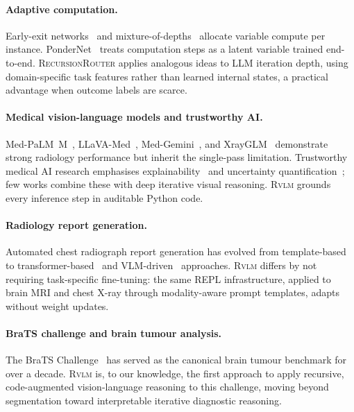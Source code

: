 \documentclass{article}
\newcommand{\RVLM}{\textsc{Rvlm}}
\newcommand{\RRouter}{\textsc{RecursionRouter}}
\begin{document}
	\paragraph{Adaptive computation.}
	Early-exit networks~\citep{teerapittayanon2016branchynet,schwartz2020right}
	and mixture-of-depths~\citep{raposo2024moe} allocate variable compute per
	instance.
	PonderNet~\citep{banino2021pondernet} treats computation steps as a latent
	variable trained end-to-end.
	\RRouter{} applies analogous ideas to LLM iteration depth, using
	domain-specific task features rather than learned internal states, 
	a practical advantage when outcome labels are scarce.
	
	\paragraph{Medical vision-language models and trustworthy AI.}
	Med-PaLM~M~\citep{tu2024medpalm}, LLaVA-Med~\citep{li2024llavamed},
	Med-Gemini~\citep{tu2025medgemini}, and XrayGLM~\citep{chen2024xrayglm}
	demonstrate strong radiology performance but inherit the single-pass
	limitation.
	Trustworthy medical AI research emphasises explainability~\citep{selvaraju2017gradcam}
	and uncertainty quantification~\citep{obermeyer2019dissecting}; few works
	combine these with deep iterative visual reasoning.
	\RVLM{} grounds every inference step in auditable Python code.
	
	\paragraph{Radiology report generation.}
	Automated chest radiograph report generation has evolved from
	template-based~\citep{jing2017automatic} to
	transformer-based~\citep{chen2020generating,miura2021improving} and
	VLM-driven~\citep{hyland2024maira,chen2024chexagent} approaches.
	\RVLM{} differs by not requiring task-specific fine-tuning: the same REPL
	infrastructure, applied to brain MRI and chest X-ray through modality-aware
	prompt templates, adapts without weight updates.
	
	\paragraph{BraTS challenge and brain tumour analysis.}
	The BraTS Challenge~\citep{menze2015brats,labella2023brats,bakas20242024}
	has served as the canonical brain tumour benchmark for over a decade.
	\RVLM{} is, to our knowledge, the first approach to apply recursive,
	code-augmented vision-language reasoning to this challenge, moving beyond
	segmentation toward interpretable iterative diagnostic reasoning.
	
\end{document}
